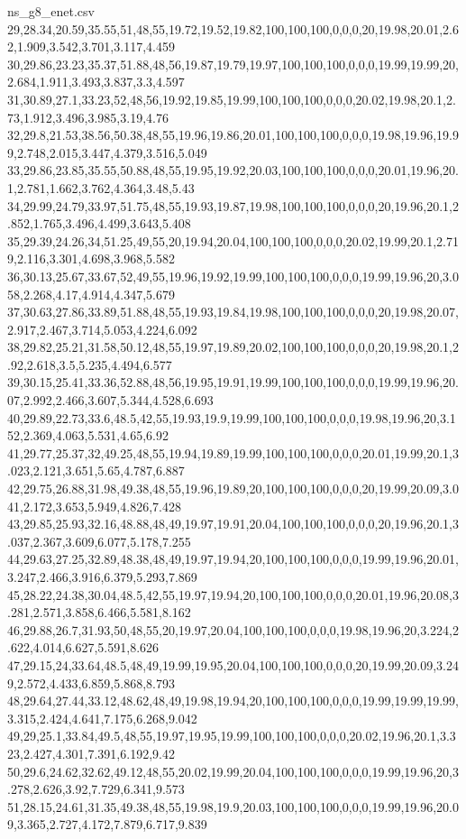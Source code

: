 \begin{filecontents*}[overwrite]{ns_g8_enet.csv}
29,28.34,20.59,35.55,51,48,55,19.72,19.52,19.82,100,100,100,0,0,0,20,19.98,20.01,2.62,1.909,3.542,3.701,3.117,4.459
30,29.86,23.23,35.37,51.88,48,56,19.87,19.79,19.97,100,100,100,0,0,0,19.99,19.99,20,2.684,1.911,3.493,3.837,3.3,4.597
31,30.89,27.1,33.23,52,48,56,19.92,19.85,19.99,100,100,100,0,0,0,20.02,19.98,20.1,2.73,1.912,3.496,3.985,3.19,4.76
32,29.8,21.53,38.56,50.38,48,55,19.96,19.86,20.01,100,100,100,0,0,0,19.98,19.96,19.99,2.748,2.015,3.447,4.379,3.516,5.049
33,29.86,23.85,35.55,50.88,48,55,19.95,19.92,20.03,100,100,100,0,0,0,20.01,19.96,20.1,2.781,1.662,3.762,4.364,3.48,5.43
34,29.99,24.79,33.97,51.75,48,55,19.93,19.87,19.98,100,100,100,0,0,0,20,19.96,20.1,2.852,1.765,3.496,4.499,3.643,5.408
35,29.39,24.26,34,51.25,49,55,20,19.94,20.04,100,100,100,0,0,0,20.02,19.99,20.1,2.719,2.116,3.301,4.698,3.968,5.582
36,30.13,25.67,33.67,52,49,55,19.96,19.92,19.99,100,100,100,0,0,0,19.99,19.96,20,3.058,2.268,4.17,4.914,4.347,5.679
37,30.63,27.86,33.89,51.88,48,55,19.93,19.84,19.98,100,100,100,0,0,0,20,19.98,20.07,2.917,2.467,3.714,5.053,4.224,6.092
38,29.82,25.21,31.58,50.12,48,55,19.97,19.89,20.02,100,100,100,0,0,0,20,19.98,20.1,2.92,2.618,3.5,5.235,4.494,6.577
39,30.15,25.41,33.36,52.88,48,56,19.95,19.91,19.99,100,100,100,0,0,0,19.99,19.96,20.07,2.992,2.466,3.607,5.344,4.528,6.693
40,29.89,22.73,33.6,48.5,42,55,19.93,19.9,19.99,100,100,100,0,0,0,19.98,19.96,20,3.152,2.369,4.063,5.531,4.65,6.92
41,29.77,25.37,32,49.25,48,55,19.94,19.89,19.99,100,100,100,0,0,0,20.01,19.99,20.1,3.023,2.121,3.651,5.65,4.787,6.887
42,29.75,26.88,31.98,49.38,48,55,19.96,19.89,20,100,100,100,0,0,0,20,19.99,20.09,3.041,2.172,3.653,5.949,4.826,7.428
43,29.85,25.93,32.16,48.88,48,49,19.97,19.91,20.04,100,100,100,0,0,0,20,19.96,20.1,3.037,2.367,3.609,6.077,5.178,7.255
44,29.63,27.25,32.89,48.38,48,49,19.97,19.94,20,100,100,100,0,0,0,19.99,19.96,20.01,3.247,2.466,3.916,6.379,5.293,7.869
45,28.22,24.38,30.04,48.5,42,55,19.97,19.94,20,100,100,100,0,0,0,20.01,19.96,20.08,3.281,2.571,3.858,6.466,5.581,8.162
46,29.88,26.7,31.93,50,48,55,20,19.97,20.04,100,100,100,0,0,0,19.98,19.96,20,3.224,2.622,4.014,6.627,5.591,8.626
47,29.15,24,33.64,48.5,48,49,19.99,19.95,20.04,100,100,100,0,0,0,20,19.99,20.09,3.249,2.572,4.433,6.859,5.868,8.793
48,29.64,27.44,33.12,48.62,48,49,19.98,19.94,20,100,100,100,0,0,0,19.99,19.99,19.99,3.315,2.424,4.641,7.175,6.268,9.042
49,29,25.1,33.84,49.5,48,55,19.97,19.95,19.99,100,100,100,0,0,0,20.02,19.96,20.1,3.323,2.427,4.301,7.391,6.192,9.42
50,29.6,24.62,32.62,49.12,48,55,20.02,19.99,20.04,100,100,100,0,0,0,19.99,19.96,20,3.278,2.626,3.92,7.729,6.341,9.573
51,28.15,24.61,31.35,49.38,48,55,19.98,19.9,20.03,100,100,100,0,0,0,19.99,19.96,20.09,3.365,2.727,4.172,7.879,6.717,9.839

\end{filecontents*}
